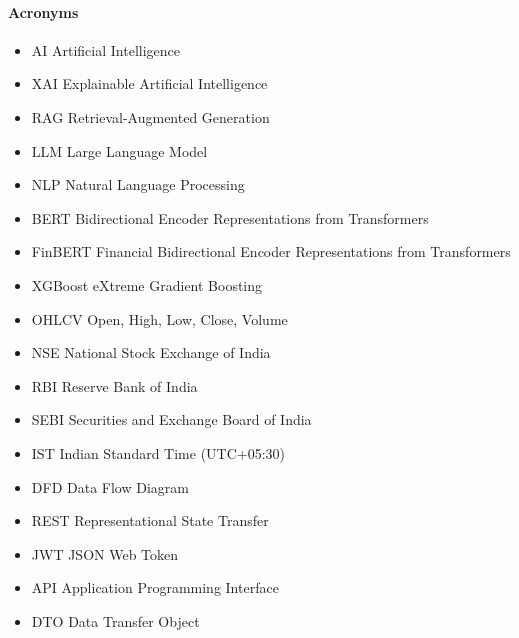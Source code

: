 \documentclass{article}
\begin{document}
	\paragraph{Acronyms}
	\begin{itemize}
		\item AI \hspace{4em} Artificial Intelligence
		\item XAI \hspace{3.4em} Explainable Artificial Intelligence
		\item RAG \hspace{3.2em} Retrieval-Augmented Generation
		\item LLM \hspace{3.2em} Large Language Model
		\item NLP \hspace{3.3em} Natural Language Processing
		\item BERT \hspace{2.7em} Bidirectional Encoder Representations from Transformers
		\item FinBERT \hspace{1.5em} Financial Bidirectional Encoder Representations from Transformers
		\item XGBoost \hspace{1.6em} eXtreme Gradient Boosting
		\item OHLCV \hspace{1.9em} Open, High, Low, Close, Volume
		\item NSE \hspace{3.3em} National Stock Exchange of India
		\item RBI \hspace{3.6em} Reserve Bank of India
		\item SEBI \hspace{3.1em} Securities and Exchange Board of India
		\item IST \hspace{3.7em} Indian Standard Time (UTC+05:30)
		\item DFD \hspace{3.3em} Data Flow Diagram
		\item REST \hspace{3.0em} Representational State Transfer
		\item JWT \hspace{3.2em} JSON Web Token
		\item API \hspace{3.7em} Application Programming Interface
		\item DTO \hspace{3.4em} Data Transfer Object
	\end{itemize}
		
\end{document}

